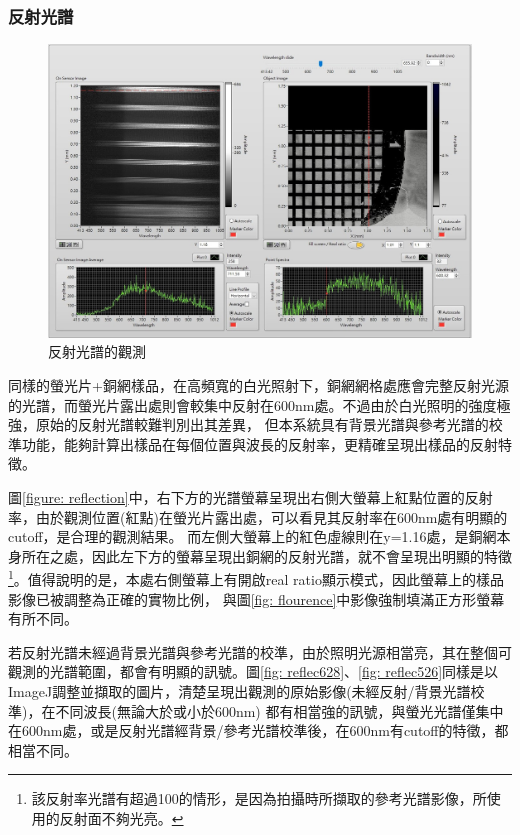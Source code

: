 \documentclass[12pt]{article}
\begin{document}
\subsubsection{反射光譜}
\begin{figure}
    \centering
    \includegraphics[width = \linewidth]{reflection (2).jpeg}
    \caption{反射光譜的觀測}
    \label{fig: reflec}
\end{figure}
同樣的螢光片+銅網樣品，在高頻寬的白光照射下，銅網網格處應會完整反射光源的光譜，而螢光片露出處則會較集中反射在600nm處。不過由於白光照明的強度極強，原始的反射光譜較難判別出其差異，
但本系統具有背景光譜與參考光譜的校準功能，能夠計算出樣品在每個位置與波長的反射率，更精確呈現出樣品的反射特徵。

圖\ref{figure: reflection}中，右下方的光譜螢幕呈現出右側大螢幕上紅點位置的反射率，由於觀測位置(紅點)在螢光片露出處，可以看見其反射率在600nm處有明顯的cutoff，是合理的觀測結果。
而左側大螢幕上的紅色虛線則在y=1.16處，是銅網本身所在之處，因此左下方的螢幕呈現出銅網的反射光譜，就不會呈現出明顯的特徵
\footnote{該反射率光譜有超過100的情形，是因為拍攝時所擷取的參考光譜影像，所使用的反射面不夠光亮。}。值得說明的是，本處右側螢幕上有開啟real ratio顯示模式，因此螢幕上的樣品影像已被調整為正確的實物比例，
與圖\ref{fig: flourence}中影像強制填滿正方形螢幕有所不同。

若反射光譜未經過背景光譜與參考光譜的校準，由於照明光源相當亮，其在整個可觀測的光譜範圍，都會有明顯的訊號。圖\ref{fig: reflec628}、\ref{fig: reflec526}同樣是以ImageJ調整並擷取的圖片，清楚呈現出觀測的原始影像(未經反射/背景光譜校準)，在不同波長(無論大於或小於600nm)
都有相當強的訊號，與螢光光譜僅集中在600nm處，或是反射光譜經背景/參考光譜校準後，在600nm有cutoff的特徵，都相當不同。
\end{document}
